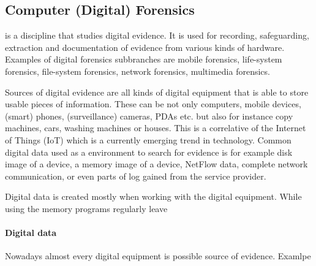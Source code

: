 \subsection{Computer (Digital) Forensics} is a discipline that studies digital evidence. It is used for recording, safeguarding, extraction and documentation of evidence from various kinds of hardware. Examples of digital forensics subbranches are mobile forensics, life-system forensics, file-system forensics, network forensics, multimedia forensics. 

Sources of digital evidence are all kinds of digital equipment that is able to store usable pieces of information. These can be not only computers, mobile devices, (smart) phones, (surveillance) cameras, PDAs etc. but also for instance copy machines, cars, washing machines or houses. This is a correlative of the Internet of Things (IoT) which is a currently emerging trend in technology. Common digital data used as a environment to search for evidence is for example disk image of a device, a memory image of a device, NetFlow data, complete network communication, or even parts of log gained from the service provider. 

Digital data is created mostly when working with the digital equipment. While using the memory programs regularly leave



\paragraph{Digital data}
 Nowadays almost every digital equipment is possible source of evidence. Examlpe

